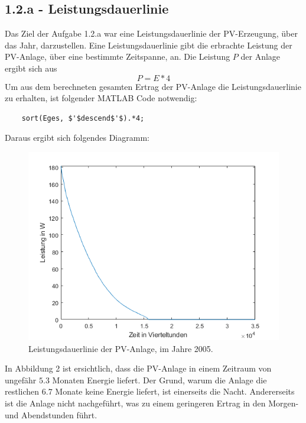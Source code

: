 \documentclass[a4paper,12pt]{article}
\begin{document}
	\subsection{1.2.a - Leistungsdauerlinie}
	Das Ziel der Aufgabe 1.2.a war eine Leistungsdauerlinie der PV-Erzeugung, über das Jahr, darzustellen.\newline
	Eine Leistungsdauerlinie gibt die erbrachte Leistung der PV-Anlage, über eine bestimmte Zeitspanne, an.\newline
	Die Leistung $P$ der Anlage ergibt sich aus
	\begin{equation}
	P=E*4
	\end{equation}
	Um aus dem berechneten gesamten Ertrag der PV-Anlage die Leistungsdauerlinie zu erhalten, ist folgender MATLAB Code notwendig:
	\begin{lstlisting}
	sort(Eges, $'$descend$'$).*4;
	\end{lstlisting}
	Daraus ergibt sich folgendes Diagramm:
	\begin{figure}[H]
		\centering
		\includegraphics[width=12cm]{img/results/Leistungsdauerlinie}
		\caption{Leistungsdauerlinie der PV-Anlage, im Jahre 2005.}
	\end{figure}
	In Abbildung 2 ist ersichtlich, dass die PV-Anlage in einem Zeitraum von ungefähr $5.3$ Monaten Energie liefert. Der Grund, warum die Anlage die restlichen $6.7$ Monate keine Energie liefert, ist einerseits die Nacht. Andererseits ist die Anlage nicht nachgeführt, was zu einem geringeren Ertrag in den Morgen- und Abendstunden führt.
\end{document}
